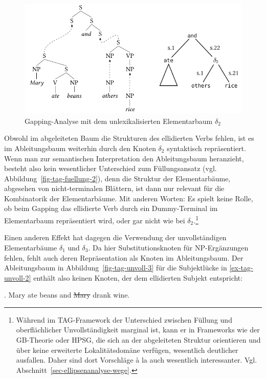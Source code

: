 \begin{figure}[t]
\centering
\includegraphics{graphics/abb831.pdf}
\caption{\label{fig-tag-unvoll-2}Gapping-Analyse mit dem unlexikalisierten Elementarbaum $\delta_2$}
\end{figure}
Obwohl im abgeleiteten Baum die Strukturen des ellidierten Verbs fehlen, ist es im Ableitungsbaum weiterhin durch den Knoten $\delta_2$ syntaktisch repräsentiert. Wenn man zur semantischen Interpretation den Ableitungsbaum heranzieht, besteht also kein wesentlicher Unterschied zum Füllungsansatz (vgl. Abbildung~\ref{fig-tag-fuellung-2}), denn die Struktur der Elementarbäume, abgesehen von nicht-terminalen Blättern, ist dann nur relevant für die Kombinatorik der Elementarbäume. Mit anderen Worten: Es spielt keine Rolle, ob beim Gapping das ellidierte Verb durch ein Dummy-Terminal im Elementarbaum repräsentiert wird, oder gar nicht wie bei $\delta_2$.\footnote{Während im TAG-Framework der Unterschied zwischen Füllung und oberflächlicher Unvollständigkeit marginal ist, kann er in Frameworks wie der GB-Theorie oder HPSG, die sich an der abgeleiteten Struktur orientieren und über keine erweiterte Lokalitätsdomäne verfügen, wesentlich deutlicher ausfallen. Daher sind dort Vorschläge \`a la \cite{Chao:87} auch wesentlich interessanter. Vgl. Abschnitt~\ref{sec-ellipsenanalyse-wege}.} 

Einen anderen Effekt hat dagegen die Verwendung der unvollständigen Elementarbäume $\delta_1$ und $\delta_3$. Da hier Substitutionsknoten für NP-Ergänzungen fehlen, fehlt auch deren Repräsentation als Knoten im Ableitungsbaum. Der Ableitungsbaum in Abbildung~\ref{fig-tag-unvoll-3} für die Subjektlücke in \ref{ex-tag-unvoll-2} enthält also keinen Knoten, der dem ellidierten Subjekt entspricht:

\ex. \label{ex-tag-unvoll-2} Mary ate beans and \sout{Mary} drank wine.


